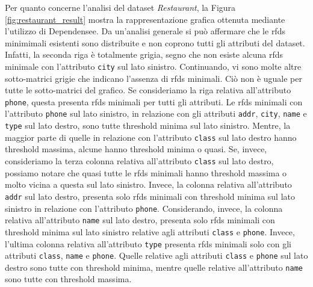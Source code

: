 Per quanto concerne l'analisi del dataset \textit{Restaurant}, la Figura \ref{fig:restaurant_result} mostra la rappresentazione grafica ottenuta mediante l'utilizzo di Dependensee. Da un'analisi generale si pu\`{o} affermare che le \acrlong{rfds} minimimali esistenti sono distribuite e non coprono tutti gli attributi del dataset. Infatti, la seconda riga \`{e} totalmente grigia, segno che non esiste alcuna \acrlong{rfds} minimale con l'attributo \texttt{city} sul lato sinistro. Continuando, vi sono molte altre sotto-matrici grigie che indicano l'assenza di \acrlong{rfds} minimali. Ci\`{o} non \`{e} uguale per tutte le sotto-matrici del grafico. Se consideriamo la riga relativa all'attributo \texttt{phone}, questa presenta \acrlong{rfds} minimali per tutti gli attributi. Le \acrlong{rfds} minimali con l'attributo \texttt{phone} sul lato sinistro, in relazione con gli attributi \texttt{addr}, \texttt{city}, \texttt{name} e \texttt{type} sul lato destro, sono tutte threshold minima sul lato sinistro. Mentre, la maggior parte di quelle in relazione con l'attributo \texttt{class} sul lato destro hanno threshold massima, alcune hanno threshold minima o quasi. Se, invece, consideriamo la terza colonna relativa all'attributo \texttt{class} sul lato destro, possiamo notare che quasi tutte le \acrlong{rfds} minimali hanno threshold massima o molto vicina a questa sul lato sinistro. Invece, la colonna relativa all'attributo \texttt{addr} sul lato destro, presenta solo \acrlong{rfds} minimali con threshold minima sul lato sinistro in relazione con l'attributo \texttt{phone}. Considerando, invece, la colonna relativa all'attributo \texttt{name} sul lato destro, presenta solo \acrlong{rfds} minimali con threshold minima sul lato sinistro relative agli attributi \texttt{class} e \texttt{phone}. Invece, l'ultima colonna relativa all'attributo \texttt{type} presenta \acrlong{rfds} minimali solo con gli attributi \texttt{class}, \texttt{name} e \texttt{phone}. Quelle relative agli attributi \texttt{class} e \texttt{phone} sul lato destro sono tutte con threshold minima, mentre quelle relative all'attributo \texttt{name} sono tutte con threshold massima.\par
